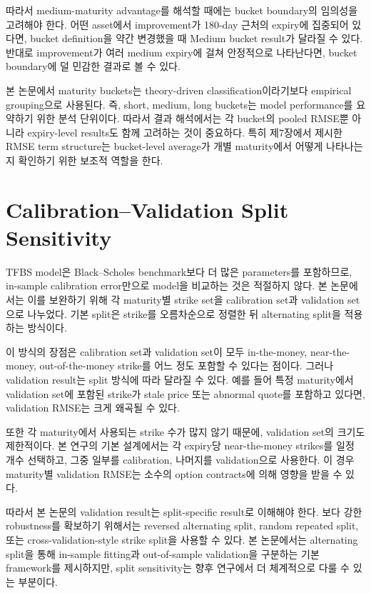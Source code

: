 \documentclass[11pt,a4paper]{report}
\begin{document}
따라서 medium-maturity advantage를 해석할 때에는 bucket boundary의 임의성을 고려해야 한다. 어떤 asset에서 improvement가 180-day 근처의 expiry에 집중되어 있다면, bucket definition을 약간 변경했을 때 Medium bucket result가 달라질 수 있다. 반대로 improvement가 여러 medium expiry에 걸쳐 안정적으로 나타난다면, bucket boundary에 덜 민감한 결과로 볼 수 있다.

본 논문에서 maturity buckets는 theory-driven classification이라기보다 empirical grouping으로 사용된다. 즉, short, medium, long buckets는 model performance를 요약하기 위한 분석 단위이다. 따라서 결과 해석에서는 각 bucket의 pooled RMSE뿐 아니라 expiry-level results도 함께 고려하는 것이 중요하다. 특히 제7장에서 제시한 RMSE term structure는 bucket-level average가 개별 maturity에서 어떻게 나타나는지 확인하기 위한 보조적 역할을 한다.

\section{Calibration--Validation Split Sensitivity}

TFBS model은 Black--Scholes benchmark보다 더 많은 parameters를 포함하므로, in-sample calibration error만으로 model을 비교하는 것은 적절하지 않다. 본 논문에서는 이를 보완하기 위해 각 maturity별 strike set을 calibration set과 validation set으로 나누었다. 기본 split은 strike를 오름차순으로 정렬한 뒤 alternating split을 적용하는 방식이다.

이 방식의 장점은 calibration set과 validation set이 모두 in-the-money, near-the-money, out-of-the-money strike를 어느 정도 포함할 수 있다는 점이다. 그러나 validation result는 split 방식에 따라 달라질 수 있다. 예를 들어 특정 maturity에서 validation set에 포함된 strike가 stale price 또는 abnormal quote를 포함하고 있다면, validation RMSE는 크게 왜곡될 수 있다.

또한 각 maturity에서 사용되는 strike 수가 많지 않기 때문에, validation set의 크기도 제한적이다. 본 연구의 기본 설계에서는 각 expiry당 near-the-money strikes를 일정 개수 선택하고, 그중 일부를 calibration, 나머지를 validation으로 사용한다. 이 경우 maturity별 validation RMSE는 소수의 option contracts에 의해 영향을 받을 수 있다.

따라서 본 논문의 validation result는 split-specific result로 이해해야 한다. 보다 강한 robustness를 확보하기 위해서는 reversed alternating split, random repeated split, 또는 cross-validation-style strike split을 사용할 수 있다. 본 논문에서는 alternating split을 통해 in-sample fitting과 out-of-sample validation을 구분하는 기본 framework를 제시하지만, split sensitivity는 향후 연구에서 더 체계적으로 다룰 수 있는 부분이다.
\end{document}
